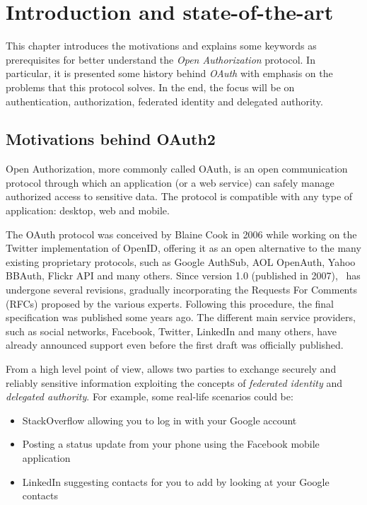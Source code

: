 \chapter{Introduction and state-of-the-art}
This chapter introduces the motivations and explains some keywords as prerequisites for better understand the \textit{Open Authorization} protocol. In particular, it is presented some history behind \textit{OAuth} with emphasis on the problems that this protocol solves. In the end, the focus will be on authentication, authorization, federated identity and delegated authority.
\minitoc

\section{Motivations behind OAuth2}
Open Authorization, more commonly called OAuth, is an open communication protocol through which an application (or a web service) can safely manage authorized access to sensitive data. The protocol is compatible with any type of application: desktop, web and mobile.

The OAuth protocol was conceived by Blaine Cook in 2006 while working on the Twitter implementation of OpenID, offering it as an open alternative to the many existing proprietary protocols, such as Google AuthSub, AOL OpenAuth, Yahoo BBAuth, Flickr API and many others. Since version 1.0 (published in 2007), \oauth\ has undergone several revisions, gradually incorporating the Requests For Comments (RFCs) proposed by the various experts. Following this procedure, the final specification was published some years ago. The different main service providers, such as social networks, Facebook, Twitter, LinkedIn and many others, have already announced support even before the first draft was officially published.

From a high level point of view, \textit{\oauth} allows two parties to exchange securely and reliably sensitive information exploiting the concepts of \textit{federated identity} and \textit{delegated authority}. For example, some real-life scenarios could be:

\begin{itemize}
    \item StackOverflow allowing you to log in with your Google account
    \item Posting a status update from your phone using the Facebook mobile application
    \item LinkedIn suggesting contacts for you to add by looking at your Google contacts
\end{itemize}

